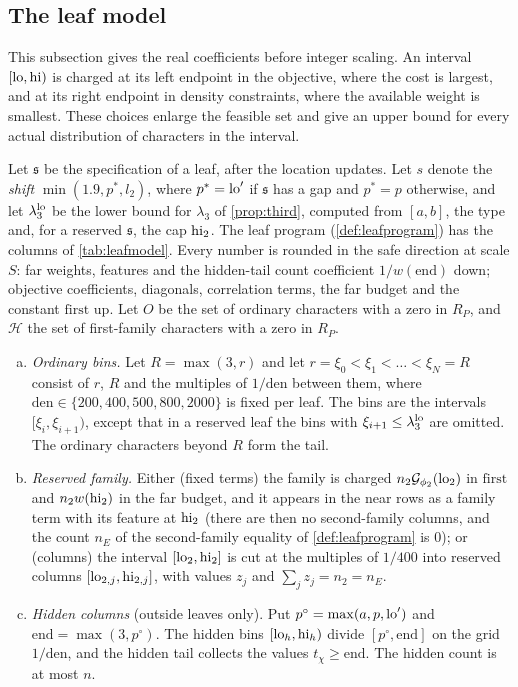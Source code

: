 \subsection{The leaf model}\label{subsec:leafmodel}
This subsection gives the real coefficients before integer scaling. An interval
$[\mathrm{lo},\mathrm{hi})$ is charged at its left endpoint in the objective, where the cost is
largest, and at its right endpoint in density constraints, where the available
weight is smallest. These choices enlarge the feasible set and give an upper bound
for every actual distribution of characters in the interval.

Let $\mathfrak s$ be the specification of a leaf, after the location updates. Let $s$ denote the
\emph{shift} $\min(1.9,p^*,l_2)$, where $p^*=\mathrm{lo}'$ if $\mathfrak s$ has a gap and $p^*=p$ otherwise, and let
$\lambda_3^{\mathrm{lo}}$ be the lower bound for $\lambda_3$ of \cref{prop:third}, computed from $[a,b]$, the
type and, for a reserved $\mathfrak s$, the cap $\mathrm{hi}_2$. The leaf program (\cref{def:leafprogram}) has the
columns of \cref{tab:leafmodel}. Every number is rounded in the safe direction at scale $S$: far weights,
features and the hidden-tail count coefficient $1/w(\mathrm{end})$ down; objective coefficients,
diagonals, correlation terms, the far budget and the constant $\mathrm{first}$ up. Let $O$ be the set
of ordinary characters with a zero in $R_P$, and $\mathcal H$ the set of first-family characters with a
zero in $R_P$.
\begin{enumerate}[(a)]
  \item \emph{Ordinary bins.} Let $R=\max(3,r)$ and let $r=\xi_0<\xi_1<\dots<\xi_N=R$ consist of $r$,
    $R$ and the multiples of $1/\mathrm{den}$ between them, where $\mathrm{den}\in\{200,400,500,800,2000\}$
    is fixed per leaf. The bins are the intervals $[\xi_i,\xi_{i+1})$, except that in a reserved leaf the
    bins with $\xi_{i+1}\le\lambda_3^{\mathrm{lo}}$ are omitted. The ordinary characters beyond $R$ form the tail.
  \item \emph{Reserved family.} Either (fixed terms) the family is charged $n_2\mathcal G_{\phi_2}(\mathrm{lo}_2)$ in
    $\mathrm{first}$ and $n_2w(\mathrm{hi}_2)$ in the far budget, and it appears in the near rows as a family
    term with its feature at $\mathrm{hi}_2$ (there are then no second-family columns, and the count $n_E$ of the
    second-family equality of \cref{def:leafprogram} is $0$); or (columns) the interval $[\mathrm{lo}_2,\mathrm{hi}_2]$ is cut
    at the multiples of $1/400$ into reserved columns $[\mathrm{lo}_{2,j},\mathrm{hi}_{2,j}]$, with values $z_j$ and
    $\sum_jz_j=n_2=n_E$.
  \item \emph{Hidden columns} (outside leaves only). Put $p^\circ=\max(a,p,\mathrm{lo}')$ and
    $\mathrm{end}=\max(3,p^\circ)$. The hidden bins $[\mathrm{lo}_h,\mathrm{hi}_h)$ divide $[p^\circ,\mathrm{end}]$ on the grid
    $1/\mathrm{den}$, and the hidden tail collects the values $t_\chi\ge\mathrm{end}$. The hidden count is at
    most $n$.
\end{enumerate}

